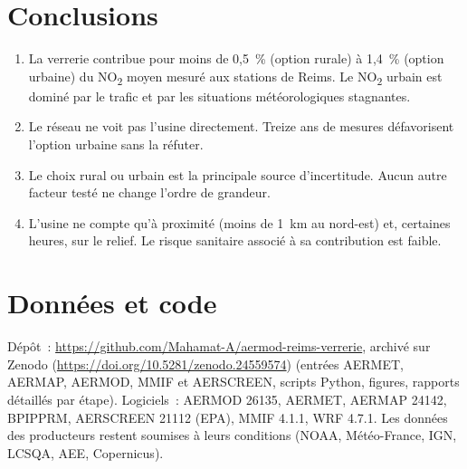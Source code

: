 \documentclass[11pt,a4paper]{article}
\newcommand{\NOd}{NO\textsubscript{2}}
\begin{document}
\section{Conclusions}
\begin{enumerate}
\item La verrerie contribue pour moins de 0,5~\% (option rurale) à 1,4~\% (option urbaine) du \NOd{} moyen
mesuré aux stations de Reims. Le \NOd{} urbain est dominé par le trafic et par les situations météorologiques
stagnantes.
\item Le réseau ne voit pas l'usine directement. Treize ans de mesures défavorisent l'option urbaine sans la réfuter.
\item Le choix rural ou urbain est la principale source d'incertitude. Aucun autre facteur testé ne change l'ordre
de grandeur.
\item L'usine ne compte qu'à proximité (moins de 1~km au nord-est) et, certaines heures, sur le relief. Le risque
sanitaire associé à sa contribution est faible.
\end{enumerate}

\section{Données et code}\label{sec:repro}
Dépôt~: \url{https://github.com/Mahamat-A/aermod-reims-verrerie}, archivé sur Zenodo
(\url{https://doi.org/10.5281/zenodo.24559574}) (entrées AERMET, AERMAP, AERMOD, MMIF et AERSCREEN,
scripts Python, figures, rapports détaillés par étape). Logiciels~: AERMOD 26135, AERMET, AERMAP 24142, BPIPPRM,
AERSCREEN 21112 (EPA), MMIF 4.1.1, WRF 4.7.1. Les données des producteurs restent soumises à leurs conditions
(NOAA, Météo-France, IGN, LCSQA, AEE, Copernicus).
\end{document}
